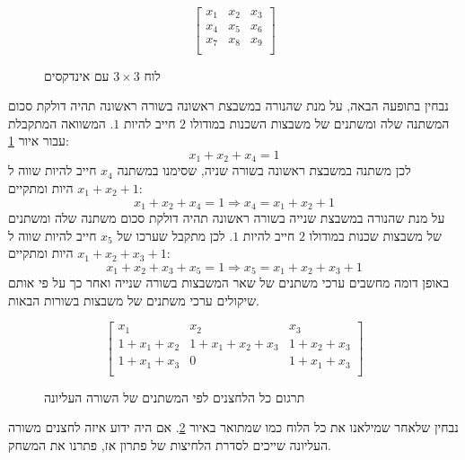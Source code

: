\documentclass[12pt,leqno]{article}
\theoremstyle{theoremdd}
\begin{document}
\begin{figure}[ht]
    \caption{לוח 
    $3 \times 3$
    עם אינדקסים}
    \label{fig: 3 x 3 board indexed}
    \centering
    \[\begin{bmatrix}
        x_1 & x_2 & x_3 \\
        x_4 & x_5 & x_6 \\
        x_7 & x_8 & x_9 \\
    \end{bmatrix}    
    \]
\end{figure}
נבחין בתופעה הבאה,
על מנת שהנורה במשבצת ראשונה בשורה ראשונה תהיה דולקת סכום המשתנה שלה 
ומשתנים של משבצות השכנות במודולו
$2$ 
חייב להיות 
$1$. 
המשוואה המתקבלת עבור איור 
\ref{fig: 3 x 3 board indexed}:
\begin{equation}
    \label{eq: cond eq}
    x_1 + x_2 + x_4 = 1  
\end{equation}
לכן משתנה 
במשבצת ראשונה בשורה שניה,
שסימנו במשתנה 
$x_4$
חייב להיות שווה ל
$x_1 + x_2 +1 $
היות ומתקיים:
\[
    x_1 + x_2 + x_4 = 1 \Rightarrow x_4 = x_1 + x_2 + 1  
\]
על מנת שהנורה במשבצת שנייה בשורה ראשונה
תהיה דולקת סכום 
משתנה שלה ומשתנים של משבצות שכנות במודולו
$2$ 
חייב להיות 
$1$.
לכן מתקבל שערכו של 
$x_5$
חייב להיות שווה ל
$x_1+x_2+x_3+1$
היות ומתקיים:
\[
    x_1 + x_2 + x_3 + x_5 = 1 \Rightarrow x_5 = x_1 + x_2 + x_3 +1
\]
 באופן דומה מחשבים ערכי משתנים של שאר המשבצות בשורה שנייה ואחר כך
 על פי אותם שיקולים ערכי משתנים של משבצות בשורות הבאות. 
 \begin{figure}[ht]
    \caption{
        תרגום כל הלחצנים לפי המשתנים של השורה העליונה
    }
    \label{fig: 3 x 3 board fill intire board}
    \centering
    \[
    \begin{bmatrix}
        x_1 & x_2 & x_3 \\
        1 + x_1 + x_2 & 1 + x_1 + x_2 + x_3 & 1 + x_2 + x_3 \\
        1 + x_1 + x_3 & 0 & 1 + x_1 + x_3 \\
    \end{bmatrix}
    \]
\end{figure}
נבחין שלאחר שמילאנו את כל הלוח כמו שמתואר באיור 
\ref{fig: 3 x 3 board fill intire board}.
אם היה ידוע איזה לחצנים משורה העליונה שייכים לסדרת הלחיצות של פתרון אז, פתרנו את המשחק.
\end{document}
